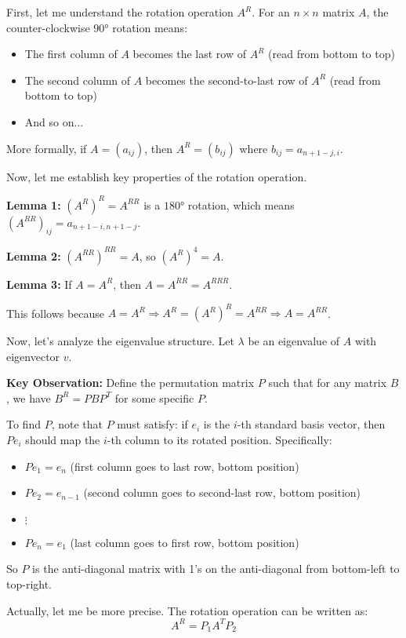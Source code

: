 \documentclass[12pt,a4paper]{article}
\theoremstyle{definition}
\begin{document}
    First, let me understand the rotation operation $A^R$. For an $n \times n$ matrix $A$, the counter-clockwise $90°$ rotation means:
    \begin{itemize}
        \item The first column of $A$ becomes the last row of $A^R$ (read from bottom to top)
        \item The second column of $A$ becomes the second-to-last row of $A^R$ (read from bottom to top)
        \item And so on...
    \end{itemize}

    More formally, if $A = (a_{ij})$, then $A^R = (b_{ij})$ where $b_{ij} = a_{n+1-j,i}$.

    Now, let me establish key properties of the rotation operation.

    \textbf{Lemma 1:} $(A^R)^R = A^{RR}$ is a $180°$ rotation, which means $(A^{RR})_{ij} = a_{n+1-i,n+1-j}$.

    \textbf{Lemma 2:} $(A^{RR})^{RR} = A$, so $(A^R)^4 = A$.

    \textbf{Lemma 3:} If $A = A^R$, then $A = A^{RR} = A^{RRR}$.

    This follows because $A = A^R \Rightarrow A^R = (A^R)^R = A^{RR} \Rightarrow A = A^{RR}$.

    Now, let's analyze the eigenvalue structure. Let $\lambda$ be an eigenvalue of $A$ with eigenvector $v$.

    \textbf{Key Observation:} Define the permutation matrix $P$ such that for any matrix $B$, we have $B^R = PBP^T$ for some specific $P$.

    To find $P$, note that $P$ must satisfy: if $e_i$ is the $i$-th standard basis vector, then $Pe_i$ should map the $i$-th column to its rotated position. Specifically:
    \begin{itemize}
        \item $Pe_1 = e_n$ (first column goes to last row, bottom position)
        \item $Pe_2 = e_{n-1}$ (second column goes to second-last row, bottom position)
        \item $\vdots$
        \item $Pe_n = e_1$ (last column goes to first row, bottom position)
    \end{itemize}

    So $P$ is the anti-diagonal matrix with 1's on the anti-diagonal from bottom-left to top-right.

    Actually, let me be more precise. The rotation operation can be written as:
    $$A^R = P_1 A^T P_2$$
\end{document}
